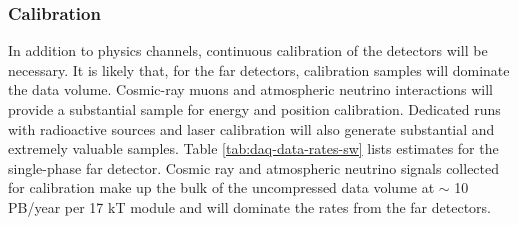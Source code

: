 \subsubsection{
Calibration}
In addition to physics channels, continuous calibration of the detectors will be necessary.  It is likely that, for the far detectors, calibration samples will  dominate the data volume. Cosmic-ray muons and atmospheric neutrino interactions will provide a substantial sample for energy and position calibration.  Dedicated runs with radioactive sources and laser calibration will also generate substantial and extremely valuable samples. Table \ref{tab:daq-data-rates-sw} lists estimates for the single-phase far detector.   Cosmic ray and atmospheric neutrino signals collected for calibration make up the bulk of the uncompressed data volume at $\sim$ 10 PB/year per 17 kT module and will dominate the rates from the far detectors.  %








%
%
%

